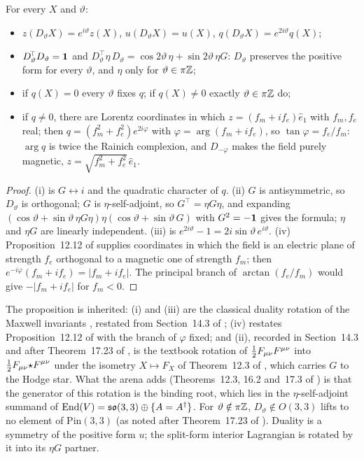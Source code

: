 \begin{proposition}
\label{d2:prop:duality}
For every $X$ and $\vartheta$:
\begin{itemize}
\item[(i)] $z(D_\vartheta X)=e^{i\vartheta}z(X)$, $u(D_\vartheta X)=u(X)$, $q(D_\vartheta X)=e^{2i\vartheta}q(X)$;
\item[(ii)] $D_\vartheta^{\!\top}D_\vartheta=\mathbf 1$ and $D_\vartheta^{\!\top}\eta\,D_\vartheta=\cos2\vartheta\,\eta+\sin2\vartheta\,\eta G$: $D_\vartheta$ preserves the positive form
for every $\vartheta$, and $\eta$ only for $\vartheta\in\pi\mathbb{Z}$;
\item[(iii)] if $q(X)=0$ every $\vartheta$ fixes $q$; if $q(X)\neq0$ exactly $\vartheta\in\pi\mathbb{Z}$ do;
\item[(iv)] if $q\neq0$, there are Lorentz coordinates in which $z=(f_m+if_e)\hat e_1$ with $f_m,f_e$ real; then $q=(f_m^2+f_e^2)e^{2i\varphi}$ with
$\varphi=\arg(f_m+if_e)$, so $\tan\varphi=f_e/f_m$: $\arg q$ is twice the Rainich complexion, and $D_{-\varphi}$ makes the field purely magnetic,
$z=\sqrt{f_m^2+f_e^2}\,\hat e_1$.
\end{itemize}
\end{proposition}

\begin{proof}
(i) is $G\leftrightarrow i$ and the quadratic character of $q$. (ii) $G$ is antisymmetric, so $D_\vartheta$ is orthogonal; $G$ is
$\eta$-self-adjoint, so $G^{\!\top}=\eta G\eta$, and expanding $(\cos\vartheta+\sin\vartheta\,\eta G\eta)\eta(\cos\vartheta+\sin\vartheta\,G)$ with $G^2=-\mathbf 1$
gives the formula; $\eta$ and $\eta G$ are linearly independent. (iii) is $e^{2i\vartheta}-1=2i\sin\vartheta\,e^{i\vartheta}$. (iv) Proposition~12.12 of
\cite{ES17} supplies coordinates in which the field is an electric plane of strength $f_e$ orthogonal to a magnetic one of strength $f_m$; then
$e^{-i\varphi}(f_m+if_e)=|f_m+if_e|$. The principal branch of $\arctan(f_e/f_m)$ would give $-|f_m+if_e|$ for $f_m<0$.
\end{proof}

The proposition is inherited: (i) and (iii) are the classical duality rotation of the Maxwell invariants
\cite{Rainich1925,Calkin65,DeserTeitelboim76}, restated from Section~14.3 of \cite{ES17}; (iv) restates Proposition~12.12 of \cite{ES17} with the
branch of $\varphi$ fixed; and (ii), recorded in Section~14.3 and after Theorem~17.23 of \cite{ES17}, is the textbook rotation of
$\tfrac12 F_{\mu\nu}F^{\mu\nu}$ into $\tfrac12 F_{\mu\nu}{\star F}^{\mu\nu}$ under the isometry $X\mapsto F_X$ of Theorem~12.3 of \cite{ES17}, which carries $G$
to the Hodge star. What the arena adds (Theorems~12.3, 16.2 and~17.3 of \cite{ES17}) is that the generator of this rotation is the binding root,
which lies in the $\eta$-self-adjoint summand of $\operatorname{End}(V)=\mathfrak{so}(3,3)\oplus\{A=A^\dagger\}$. For $\vartheta\notin\pi\mathbb{Z}$, $D_\vartheta\notin O(3,3)$ lifts to no
element of $\mathrm{Pin}(3,3)$ (as noted after Theorem~17.23 of \cite{ES17}). Duality is a symmetry of the positive form $u$; the split-form
interior Lagrangian is rotated by it into its $\eta G$ partner.


